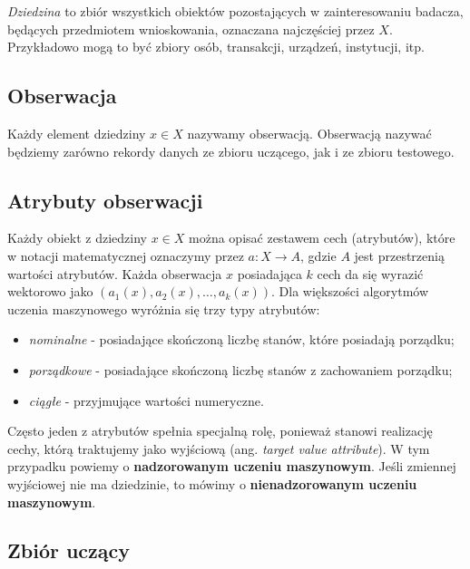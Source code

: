 \documentclass[]{book}
\providecommand{\tightlist}{%
  \setlength{\itemsep}{0pt}\setlength{\parskip}{0pt}}
\theoremstyle{plain}
\theoremstyle{definition}
\theoremstyle{definition}
\theoremstyle{definition}
\theoremstyle{definition}
\theoremstyle{remark}
\begin{document}
\emph{Dziedzina} to zbiór wszystkich obiektów pozostających w zainteresowaniu badacza, będących przedmiotem wnioskowania, oznaczana najczęściej przez \(X\). Przykładowo mogą to być zbiory osób, transakcji, urządzeń, instytucji, itp.

\hypertarget{obserwacja}{%
\subsection{Obserwacja}\label{obserwacja}}

Każdy element dziedziny \(x\in X\) nazywamy obserwacją. Obserwacją nazywać będziemy zarówno rekordy danych ze zbioru uczącego, jak i ze zbioru testowego.

\hypertarget{atrybuty-obserwacji}{%
\subsection{Atrybuty obserwacji}\label{atrybuty-obserwacji}}

Każdy obiekt z dziedziny \(x\in X\) można opisać zestawem cech (atrybutów), które w notacji matematycznej oznaczymy przez \(a:X\to A\), gdzie \(A\) jest przestrzenią wartości atrybutów. Każda obserwacja \(x\) posiadająca \(k\) cech da się wyrazić wektorowo jako \((a_1(x), a_2(x), \ldots, a_k(x))\). Dla większości algorytmów uczenia maszynowego wyróżnia się trzy typy atrybutów:

\begin{itemize}
\tightlist
\item
  \emph{nominalne} - posiadające skończoną liczbę stanów, które posiadają porządku;
\item
  \emph{porządkowe} - posiadające skończoną liczbę stanów z zachowaniem porządku;
\item
  \emph{ciągłe} - przyjmujące wartości numeryczne.
\end{itemize}

Często jeden z atrybutów spełnia specjalną rolę, ponieważ stanowi realizację cechy, którą traktujemy jako wyjściową (ang. \emph{target value attribute}). W tym przypadku powiemy o \textbf{nadzorowanym uczeniu maszynowym}. Jeśli zmiennej wyjściowej nie ma dziedzinie, to mówimy o \textbf{nienadzorowanym uczeniu maszynowym}.

\hypertarget{zbior-uczacy}{%
\subsection{Zbiór uczący}\label{zbior-uczacy}}
\end{document}
